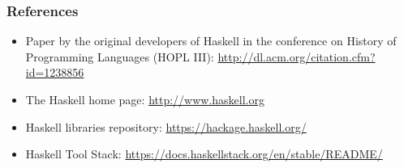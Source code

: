 \documentclass{beamer}
\begin{document}
\begin{frame}
  \frametitle{References}
  \begin{itemize}
  \item Paper by the original developers of Haskell in the conference on History of
    Programming Languages (HOPL III): \href{A History
      of Haskell: Being Lazy with
      Class}{http://dl.acm.org/citation.cfm?id=1238856}
  \item The Haskell home page: \url{http://www.haskell.org}
  \item Haskell libraries repository:
    \url{https://hackage.haskell.org/}
  \item Haskell Tool Stack: \url{https://docs.haskellstack.org/en/stable/README/}
  \end{itemize}
\end{frame}


\begin{frame}
  \begin{center}
  \end{center}
\end{frame}
\end{document}
